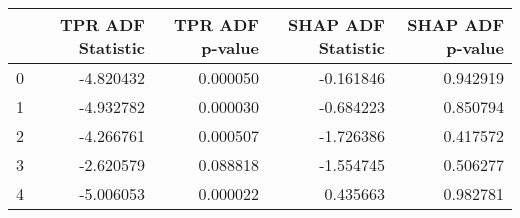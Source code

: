 \begin{tabular}{lrrrr}
\toprule
 & TPR ADF Statistic & TPR ADF p-value & SHAP ADF Statistic & SHAP ADF p-value \\
\midrule
0 & -4.820432 & 0.000050 & -0.161846 & 0.942919 \\
1 & -4.932782 & 0.000030 & -0.684223 & 0.850794 \\
2 & -4.266761 & 0.000507 & -1.726386 & 0.417572 \\
3 & -2.620579 & 0.088818 & -1.554745 & 0.506277 \\
4 & -5.006053 & 0.000022 & 0.435663 & 0.982781 \\
\bottomrule
\end{tabular}
